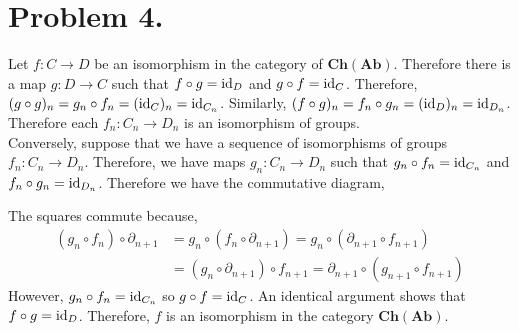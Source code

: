 \documentclass[12pt]{extarticle}
\newcommand{\abchains}{\mathbf{Ch(Ab)}}
\begin{document}
\section*{Problem 4.}

Let $f : C \to D$ be an isomorphism in the category of $\abchains$. Therefore there is a map $g : D \to C$ such that $f \circ g = \mathrm{id}_{D}$ and $g \circ f = \mathrm{id}_C$. Therefore, $(g \circ g)_n = g_n \circ f_n = (\mathrm{id}_C)_n = \mathrm{id}_{C_n}$. Similarly, $(f \circ g)_n = f_n \circ g_n = (\mathrm{id}_D)_n = \mathrm{id}_{D_n}$. Therefore each $f_n : C_n \to D_n$ is an isomorphism of groups. 
\bigskip\\
Conversely, suppose that we have a sequence of isomorphisms of groups $f_n : C_n \to D_n$. Therefore, we have maps $g_n : C_n \to D_n$ such that $g_n \circ f_n = \mathrm{id}_{C_n}$ and $f_n \circ g_n = \mathrm{id}_{D_n}$. Therefore we have the commutative diagram, 
\begin{center}
\end{center}
The squares commute because,
\begin{align*}
(g_{n} \circ f_{n}) \circ \partial_{n+1} & = g_{n} \circ (f_{n} \circ \partial_{n+1}) = g_{n} \circ (\partial_{n+1} \circ f_{n+1})
\\
& = (g_{n} \circ \partial_{n+1}) \circ f_{n+1} = \partial_{n+1} \circ (g_{n+1} \circ f_{n+1})
\end{align*}
However, $g_{n} \circ f_{n} = \mathrm{id}_{C_n}$ so $g \circ f = \mathrm{id}_C$. An identical argument shows that $f \circ g = \mathrm{id}_{D}$. Therefore, $f$ is an isomorphism in the category $\abchains$.
\end{document}
